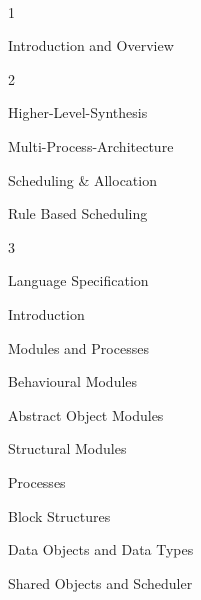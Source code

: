 \newpage
\def\thesection{Table of Content}
\thispagestyle{mychapter}{\hskip-30mm\Large\bf\thesection}\\

\def\tocI{Introduction and Overview}
{\vskip5pt\bf\large\hskip-30pt\parbox{30pt}{ 1}\parbox{0.95\textwidth}{\tocI\dotfill\pageref{toclabelI}}}\vskip10pt

\def\tocII{Higher-Level-Synthesis}
{\vskip5pt\bf\large\hskip-30pt\parbox{30pt}{ 2}\parbox{0.95\textwidth}{\tocII\dotfill\pageref{toclabelII}}}\vskip10pt

\def\tocIII{Multi-Process-Architecture}
{\bf{\parbox{0.95\textwidth}{\hskip10pt\tocIII\dotfill\pageref{toclabelIII}}}}\vskip5pt

\def\tocIV{Scheduling \& Allocation}
{\bf{\parbox{0.95\textwidth}{\hskip10pt\tocIV\dotfill\pageref{toclabelIV}}}}\vskip5pt

\def\tocV{Rule Based Scheduling}
{\bf{\parbox{0.95\textwidth}{\hskip10pt\tocV\dotfill\pageref{toclabelV}}}}\vskip5pt

\def\tocVI{Language Specification}
{\vskip5pt\bf\large\hskip-30pt\parbox{30pt}{ 3}\parbox{0.95\textwidth}{\tocVI\dotfill\pageref{toclabelVI}}}\vskip10pt

\def\tocVII{Introduction}
{\bf{\parbox{0.95\textwidth}{\hskip10pt\tocVII\dotfill\pageref{toclabelVII}}}}\vskip5pt

\def\tocVIII{Modules and Processes}
{\bf{\parbox{0.95\textwidth}{\hskip10pt\tocVIII\dotfill\pageref{toclabelVIII}}}}\vskip5pt

\def\tocIX{Behavioural Modules}
{\bf{\parbox{0.95\textwidth}{\hskip20pt\tocIX\dotfill\pageref{toclabelIX}}}}\vskip5pt

\def\tocX{Abstract Object Modules}
{\bf{\parbox{0.95\textwidth}{\hskip20pt\tocX\dotfill\pageref{toclabelX}}}}\vskip5pt

\def\tocXI{Structural Modules}
{\bf{\parbox{0.95\textwidth}{\hskip20pt\tocXI\dotfill\pageref{toclabelXI}}}}\vskip5pt

\def\tocXII{Processes}
{\bf{\parbox{0.95\textwidth}{\hskip20pt\tocXII\dotfill\pageref{toclabelXII}}}}\vskip5pt

\def\tocXIII{Block Structures}
{\bf{\parbox{0.95\textwidth}{\hskip10pt\tocXIII\dotfill\pageref{toclabelXIII}}}}\vskip5pt

\def\tocXIV{Data Objects and Data Types}
{\bf{\parbox{0.95\textwidth}{\hskip10pt\tocXIV\dotfill\pageref{toclabelXIV}}}}\vskip5pt

\def\tocXV{Shared Objects and Scheduler}
{\bf{\parbox{0.95\textwidth}{\hskip20pt\tocXV\dotfill\pageref{toclabelXV}}}}\vskip5pt

